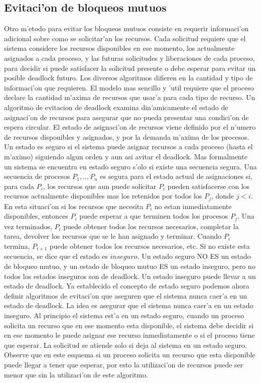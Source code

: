 \documentclass[a4paper,10pt]{article}
\begin{document}
\subsection{Evitaci'on de bloqueos mutuos}
Otro m'etodo para evitar los bloqueos mutuos consiste en requerir informaci'on adicional sobre como se solicitar'an los recursos. Cada solicitud requiere que el sistema considere los recursos disponibles en ese momento, los actualmente asignados a cada proceso, y las futuras solicitudes y liberaciones de cada proceso, para decidir si puede satisfacer la solicitud presente o debe esperar para evitar un posible deadlock futuro.
Los diversos algoritmos difieren en la cantidad y tipo de informaci'on que requieren. El modelo mas sencillo y 'util requiere que el proceso declare la cantidad m'axima de recursos que usar'a para cada tipo de recurso. Un algoritmo de evitacion de deadlock examina din'amicamente el estado de asignaci'on de recursos para asegurar que no pueda presentar una condici'on de espera circular. El estado de asignaci'on de recursos viene definido por el n'umero de recursos disponibles y asignados, y por la demanda m'axima de los procesos. Un estado es seguro si el sistema puede asignar recursos a cada proceso (hasta el m'aximo) siguiendo algun orden y aun asi avitar el deadlock. Mas formalmente un sistema se encuentra en estado seguro s'olo si existe una secuencia segura. Una secuencia de procesos $P_{1},..,P_{n}$ es segura para el estado actual de asignaciones si, para cada $P_{i}$, los recursos que aun puede solicitar $P_{i}$ pueden satisfacerse con los recursos actualmente disponibles mas los retenidos por todos los $P_{j}$, donde $j<i$. En esta situaci'on si los recursos que necesita $P_{i}$ no estan inmediatamente disponibles, entonces $P_{i}$ puede esperar a que terminen todos los procesos $P_{j}$. Una vez terminados, $P_{i}$ puede obtener todos los recursos necesarios, completar la tarea, devolver los recursos que se le han asignado y terminar. Cuando $P_{i}$ termina, $P_{i+1}$ puede obtener todos los recursos necesarios, etc. Si no existe esta secuencia, se dice que el estado es $inseguro$.
Un estado seguro NO ES un estado de bloqueo mutuo, y un estado de bloqueo mutuo ES un estado inseguro, pero no todos los estados inseguros son de deadlock. Un estado inseguro puede llevar a un estado de deadlock.
Ya establecido el concepto de estado seguro podemos ahora definir algoritmos de evitaci'on que aseguren que el sistema nunca caer'a en un estado de deadlock. La idea es asegurar que el sistema nunca caer'a en un estado inseguro. Al principio el sistema est'a en un estado seguro, cuando un proceso solicita un recurso que en ese momento esta disponible, el sistema debe decidir si en ese momento le puede asignar ese recurso inmediatamente o si el proceso tiene que esperar. La solicitud se atiende solo si deja al sistema en un estado seguro.
Observe que en este esquema si un proceso solicita un recurso que esta disponible puede llegar a tener que esperar, por esto la utilizaci'on de recursos puede ser menor que sin la utilizaci'on de este algoritmo.
\end{document}
